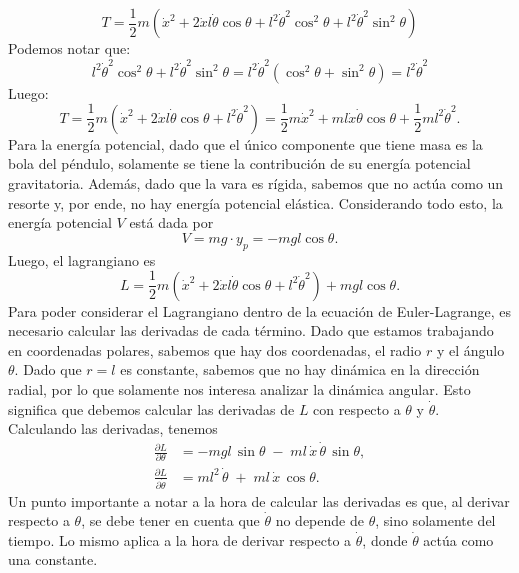 \documentclass[
  11pt,
  letterpaper,
   addpoints,
   answers
  ]{exam}
\begin{document}
\begin{questions}
\begin{solution}
\begin{equation}
    T = \frac{1}{2} m \left( \dot{x}^2 + 2 \dot{x} l \dot{\theta} \cos \theta + l^2 \dot{\theta}^2 \cos^2 \theta + l^2 \dot{\theta}^2 \sin^2 \theta \right)
\end{equation}
Podemos notar que:
\begin{equation}
    l^2 \dot{\theta}^2 \cos^2 \theta + l^2 \dot{\theta}^2 \sin^2 \theta = l^2 \dot{\theta}^2 (\cos^2 \theta + \sin^2 \theta) = l^2 \dot{\theta}^2
\end{equation}
Luego:
\begin{equation}
    T = \frac{1}{2} m \left( \dot{x}^2 + 2 \dot{x} l \dot{\theta} \cos \theta + l^2 \dot{\theta}^2 \right) = \frac{1}{2} m \dot{x}^2 + m l \dot{x} \dot{\theta} \cos \theta + \frac{1}{2} m l^2 \dot{\theta}^2. 
\end{equation}
Para la energía potencial, dado que el único componente que tiene masa es la bola del péndulo, solamente se tiene la contribución de su energía potencial gravitatoria. Además, dado que la vara es rígida, sabemos que no actúa como un resorte y, por ende, no hay energía potencial elástica. Considerando todo esto, la energía potencial $V$ está dada por
\begin{equation}
    V = mg \cdot y_p = -mgl \cos \theta. 
\end{equation}
Luego, el lagrangiano es
\begin{equation}
    L = \frac{1}{2} m \left( \dot{x}^2 + 2 \dot{x} l \dot{\theta} \cos \theta + l^2 \dot{\theta}^2 \right) + mgl \cos \theta. 
\end{equation}
Para poder considerar el Lagrangiano dentro de la ecuación de Euler-Lagrange, es necesario calcular las derivadas de cada término. Dado que estamos trabajando en coordenadas polares, sabemos que hay dos coordenadas, el radio \(r\) y el ángulo \(\theta\). Dado que \(r = l\) es constante, sabemos que no hay dinámica en la dirección radial, por lo que solamente nos interesa analizar la dinámica angular. Esto significa que debemos calcular las derivadas de \(L\) con respecto a \(\theta\) y \(\dot{\theta}\). Calculando las derivadas, tenemos
\begin{align}
    \frac{\partial L}{\partial \theta} &= -mgl \,\sin \theta \;-\; ml\,\dot{x}\,\dot{\theta}\,\sin \theta, \\
    \frac{\partial L}{\partial \dot{\theta}} &= ml^2\,\dot{\theta} \;+\; ml\,\dot{x}\,\cos \theta.
\end{align}
Un punto importante a notar a la hora de calcular las derivadas es que, al derivar respecto a $\theta$, se debe tener en cuenta que $\dot{\theta}$ no depende de $\theta$, sino solamente del tiempo. Lo mismo aplica a la hora de derivar respecto a $\dot{\theta}$, donde $\dot{\theta}$ actúa como una constante.

\end{solution}
\end{questions}
\end{document}
